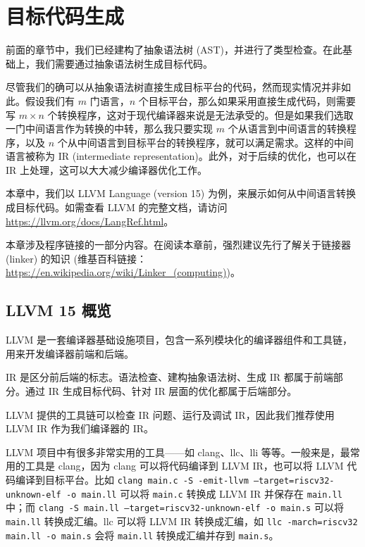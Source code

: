 \chapter{目标代码生成}

前面的章节中，我们已经建构了抽象语法树 (AST)，并进行了类型检查。在此基础上，我们需要通过抽象语法树生成目标代码。

尽管我们的确可以从抽象语法树直接生成目标平台的代码，然而现实情况并非如此。假设我们有
$m$ 门语言，$n$ 个目标平台，那么如果采用直接生成代码，则需要写 $m\times n$
个转换程序，这对于现代编译器来说是无法承受的。但是如果我们选取一门中间语言作为转换的中转，那么我只要实现
$m$ 个从语言到中间语言的转换程序，以及 $n$ 个从中间语言到目标平台的转换程序，就可以满足需求。这样的中间语言被称为
IR (intermediate representation)。此外，对于后续的优化，也可以在 IR 上处理，这可以大大减少编译器优化工作。

本章中，我们以 LLVM Language (version 15) 为例，来展示如何从中间语言转换成目标代码。如需查看
LLVM 的完整文档，请访问 \url{https://llvm.org/docs/LangRef.html}。

\begin{remark}
本章涉及程序链接的一部分内容。在阅读本章前，强烈建议先行了解关于链接器 (linker) 的知识
(维基百科链接：\url{https://en.wikipedia.org/wiki/Linker_(computing)})。
\end{remark}

\section{LLVM 15 概览}

LLVM 是一套编译器基础设施项目，包含一系列模块化的编译器组件和工具链，用来开发编译器前端和后端。

IR 是区分前后端的标志。语法检查、建构抽象语法树、生成 IR 都属于前端部分。通过 IR
生成目标代码、针对 IR 层面的优化都属于后端部分。

LLVM 提供的工具链可以检查 IR 问题、运行及调试 IR，因此我们推荐使用 LLVM IR
作为我们编译器的 IR。

LLVM 项目中有很多非常实用的工具——如 clang、llc、lli 等等。一般来是，最常用的工具是
clang，因为 clang 可以将代码编译到 LLVM IR，也可以将 LLVM 代码编译到目标平台。比如
\texttt{clang main.c -S -emit-llvm --target=riscv32-unknown-elf -o main.ll}
可以将 \texttt{main.c} 转换成 LLVM IR 并保存在 \texttt{main.ll} 中；而
\texttt{clang -S main.ll --target=riscv32-unknown-elf -o main.s}
可以将 \texttt{main.ll} 转换成汇编。llc 可以将 LLVM IR 转换成汇编，如
\texttt{llc -march=riscv32 main.ll -o main.s} 会将 \texttt{main.ll}
转换成汇编并存到 \texttt{main.s}。


